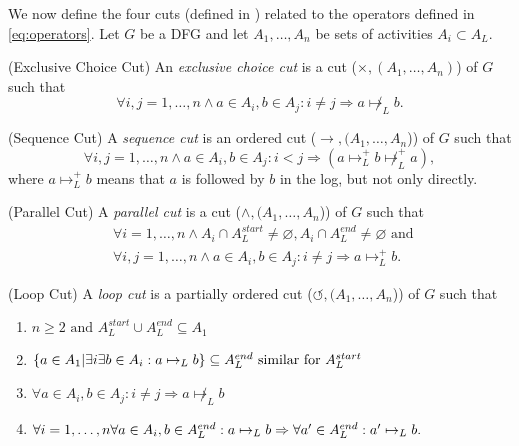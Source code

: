 \documentclass[a4paper]{IEEEtran}
\begin{document}
We now define the four cuts (defined in \cite{process_mining, inductivemining-constructive}) related to the operators defined in \ref{eq:operators}. Let $G$ be a DFG and let $A_1, \dots, A_n$ be sets of activities $A_i \subset A_L$.

\begin{defn} (Exclusive Choice Cut)
An \textit{exclusive choice cut} is a cut ($\times, (A_1, \dots, A_n)$) of $G$ such that
$$
\forall i,j = 1, \dots, n \wedge a \in A_i, b \in A_j: i \neq j \Rightarrow a \not \mapsto_L b.
$$
\end{defn}

\begin{defn} (Sequence Cut)
A \textit{sequence cut} is an ordered cut ($\rightarrow, (A_1, \dots, A_n$)) of $G$ such that
$$
\forall i,j =1,\dots, n \wedge  a \in A_i, b \in A_j: i < j \Rightarrow (a \mapsto_L^{+} b \not \mapsto^{+}_L a),
$$
where $a \mapsto_L^{+} b$ means that $a$ is followed by $b$ in the log, but not only directly. 
\end{defn}

\begin{defn} (Parallel Cut)
A \textit{parallel cut} is a cut ($\wedge,( A_1, \dots, A_n$)) of $G$ such that
\begin{align*}
&\forall i = 1,\dots, n \wedge A_i \cap A_L^{start} \neq \varnothing, A_i \cap A_L^{end} \neq \varnothing \text{ and } \\
&\forall i,j = 1, \dots, n \wedge a \in A_i, b \in A_j : i \neq j \Rightarrow a \mapsto_L^{+} b .
\end{align*}
\end{defn}

\begin{defn} (Loop Cut)
A \textit{loop cut} is a partially ordered cut ($\circlearrowleft,( A_1, \dots, A_n$)) of $G$ such that
\begin{enumerate}
    \item $n \geq 2 \text{ and } A_L^{start} \cup A_L^{end} \subseteq A_1 $ 
    \item $ \{ a \in A_1 | \exists i \exists b \in A_i: a \mapsto_L b \} \\ \subseteq A_L^{end} \text{ similar for } A_L^{start} $
    \item $ \forall a \in A_i, b \in A_j : i \neq j \Rightarrow a \not \mapsto_L b$
    \item $ \forall i = 1, \dots, n \forall a \in A_i, b \in A_L^{end} : a \mapsto_L b \\ 
    \Rightarrow \forall a' \in A_L^{end} : a' \mapsto_L b .
    $ 
\end{enumerate}
\end{defn}
\end{document}
